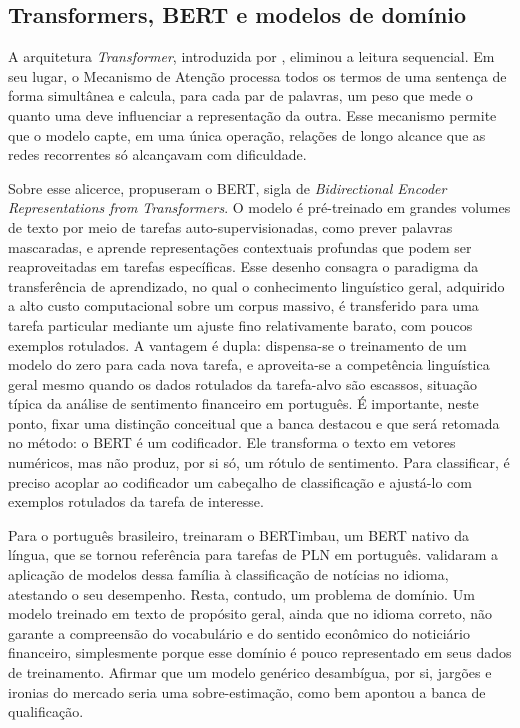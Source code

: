 \subsection{Transformers, BERT e modelos de domínio}

A arquitetura \textit{Transformer}, introduzida por , eliminou a leitura sequencial. Em seu lugar, o Mecanismo de Atenção processa todos os termos de uma sentença de forma simultânea e calcula, para cada par de palavras, um peso que mede o quanto uma deve influenciar a representação da outra. Esse mecanismo permite que o modelo capte, em uma única operação, relações de longo alcance que as redes recorrentes só alcançavam com dificuldade.

Sobre esse alicerce,  propuseram o BERT, sigla de \textit{Bidirectional Encoder Representations from Transformers}. O modelo é pré-treinado em grandes volumes de texto por meio de tarefas auto-supervisionadas, como prever palavras mascaradas, e aprende representações contextuais profundas que podem ser reaproveitadas em tarefas específicas. Esse desenho consagra o paradigma da transferência de aprendizado, no qual o conhecimento linguístico geral, adquirido a alto custo computacional sobre um corpus massivo, é transferido para uma tarefa particular mediante um ajuste fino relativamente barato, com poucos exemplos rotulados. A vantagem é dupla: dispensa-se o treinamento de um modelo do zero para cada nova tarefa, e aproveita-se a competência linguística geral mesmo quando os dados rotulados da tarefa-alvo são escassos, situação típica da análise de sentimento financeiro em português. É importante, neste ponto, fixar uma distinção conceitual que a banca destacou e que será retomada no método: o BERT é um codificador. Ele transforma o texto em vetores numéricos, mas não produz, por si só, um rótulo de sentimento. Para classificar, é preciso acoplar ao codificador um cabeçalho de classificação e ajustá-lo com exemplos rotulados da tarefa de interesse.

Para o português brasileiro,  treinaram o BERTimbau, um BERT nativo da língua, que se tornou referência para tarefas de PLN em português.  validaram a aplicação de modelos dessa família à classificação de notícias no idioma, atestando o seu desempenho. Resta, contudo, um problema de domínio. Um modelo treinado em texto de propósito geral, ainda que no idioma correto, não garante a compreensão do vocabulário e do sentido econômico do noticiário financeiro, simplesmente porque esse domínio é pouco representado em seus dados de treinamento. Afirmar que um modelo genérico desambígua, por si, jargões e ironias do mercado seria uma sobre-estimação, como bem apontou a banca de qualificação.

